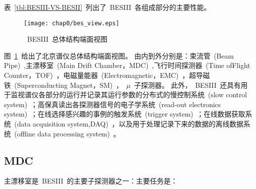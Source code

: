 表~\ref{tbl:BESIII-VS-BESII}~列出了~BESIII~各组成部分的主要性能。
\begin{table}[h]
	\centering
	\caption{\label{tbl:BESIII-VS-BESII} BESIII~和~BESII~探测器的比较}
\end{table}

\begin{figure}[!h]
  \centering
  \texttt{[image: chap0/bes\_view.eps]}
  \caption{~BESIII~总体结构端面视图}
  \label{fig:BESIII}
\end{figure}
图~\ref{fig:BESIII}~给出了北京谱仪总体结构端面视图。
由内到外分别是：束流管~(Beam Pipe)~,主漂移室~(Main Drift Chamber，MDC)~,飞行时间探测器~(Time ofFlight Counter，TOF)~，电磁量能器~(Electromagnetic，EMC)~，超导磁铁~(Superconducting Magnet，SM)~，~$\mu$~子探测器。
此外，~BESIII~还具有用于监视谱仪各部分的运行并记录其运行参数的分布式的慢控制系统~(slow control system)~；高保真读出各探测器信号的电子学系统~(read-out electronics system)~；在线选择感兴趣的事例的触发系统~(trigger system)~；在线数据获取系统~(data acquisition system,DAQ)~，以及用于处理记录下来的数据的离线数据系统~(offline data processing system)~。
\subsection{MDC}
主漂移室是~BESIII~的主要子探测器之一：主要任务是：


